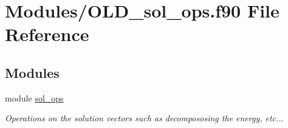 \hypertarget{OLD__sol__ops_8f90}{}\section{Modules/\+O\+L\+D\+\_\+sol\+\_\+ops.f90 File Reference}
\label{OLD__sol__ops_8f90}
\subsection*{Modules}
\begin{DoxyCompactItemize}
\item 
module \hyperlink{namespacesol__ops}{sol\+\_\+ops}
\begin{DoxyCompactList}\small\item\em Operations on the solution vectors such as decompososing the energy, etc... \end{DoxyCompactList}\end{DoxyCompactItemize}
